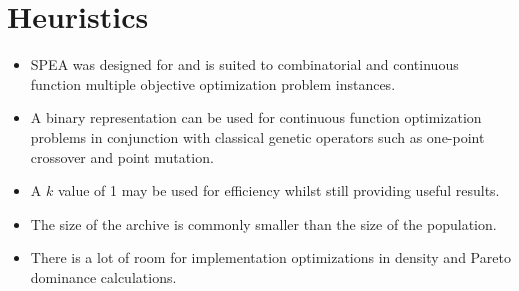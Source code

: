 \documentclass[a4paper, 11pt]{article}
\begin{document}
\section{Heuristics}
\label{sec:heuristics}
\begin{itemize}
	\item SPEA was designed for and is suited to combinatorial and continuous function multiple objective optimization problem instances.
	\item A binary representation can be used for continuous function optimization problems in conjunction with classical genetic operators such as one-point crossover and point mutation.
	\item A $k$ value of 1 may be used for efficiency whilst still providing useful results.
	\item The size of the archive is commonly smaller than the size of the population.
	\item There is a lot of room for implementation optimizations in density and Pareto dominance calculations.
\end{itemize}

\end{document}
